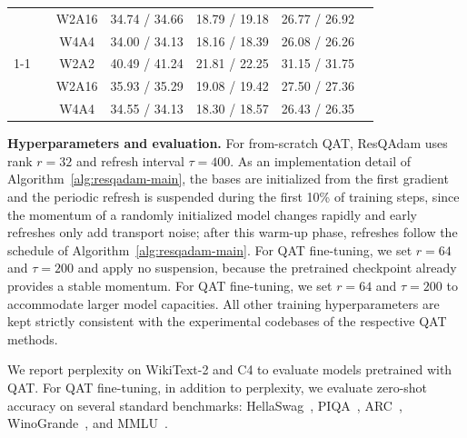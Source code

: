 \documentclass{article} %
\begin{document}
\begin{table}[b]
{\begin{tabular}{c|c|c|c|c|c|c}
                       &                       & W2A16 & 34.74 / 34.66 & 18.79 / 19.18 & 26.77 / 26.92 &                                   \\
                       &                       & W4A4  & 34.00 / 34.13 & 18.16 / 18.39 & 26.08 / 26.26 &                                   \\ \cline{1-1} \cline{3-6}
\multirow{3}{*}{CAGE}  &                       & W2A2  & 40.49 / 41.24 & 21.81 / 22.25 & 31.15 / 31.75 &                                   \\
                       &                       & W2A16 & 35.93 / 35.29 & 19.08 / 19.42 & 27.50 / 27.36 &                                   \\
                       &                       & W4A4  & 34.55 / 34.13 & 18.30 / 18.57 & 26.43 / 26.35 &                                   \\ \bottomrule
\end{tabular}
}
\end{table}

\textbf{Hyperparameters and evaluation.} 
For from-scratch QAT, ResQAdam uses rank $r=32$ and refresh interval $\tau=400$.
As an implementation detail of Algorithm~\ref{alg:resqadam-main}, the bases are initialized from the first gradient and the periodic refresh is suspended during the first 10\% of training steps, since the momentum of a randomly initialized model changes rapidly and early refreshes only add transport noise; after this warm-up phase, refreshes follow the schedule of Algorithm~\ref{alg:resqadam-main}. For QAT fine-tuning, we set $r=64$ and $\tau=200$ and apply no suspension, because the pretrained checkpoint already provides a stable momentum.
For QAT fine-tuning, we set $r=64$ and $\tau=200$ to accommodate larger model capacities.
All other training hyperparameters are kept strictly consistent with the experimental codebases of the respective QAT methods.

We report perplexity on WikiText-2 and C4 to evaluate models pretrained with QAT.
For QAT fine-tuning, in addition to perplexity, we evaluate zero-shot accuracy on several standard benchmarks: HellaSwag~\citep{zellers2019hellaswag}, PIQA~\citep{bisk2020piqa}, ARC~\citep{clark2018think}, WinoGrande~\citep{sakaguchi2021winogrande}, and MMLU~\citep{hendryckstest2021}.
\end{document}
